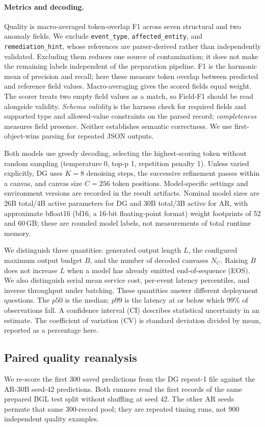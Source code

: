 \paragraph{Metrics and decoding.}
Quality is macro-averaged token-overlap F1 across seven structural and two
anomaly fields. We exclude \texttt{event\_type},
\texttt{affected\_entity}, and \texttt{remediation\_hint}, whose
references are parser-derived rather than independently validated.
Excluding them reduces one source of contamination; it does not make the
remaining labels independent of the preparation pipeline.
F1 is the harmonic mean of precision and recall; here these measure token
overlap between predicted and reference field values. Macro-averaging gives
the scored fields equal weight. The scorer treats two empty field values
as a match, so Field-F1 should be
read alongside validity. \emph{Schema validity} is the harness check for
required fields and supported type and allowed-value constraints on the parsed record;
\emph{completeness} measures field presence. Neither establishes semantic
correctness. We use first-object-wins parsing for repeated JSON outputs.

Both models use greedy decoding, selecting the highest-scoring token
without random sampling (temperature 0, top-p 1, repetition penalty 1).
Unless varied explicitly, DG uses $K{=}8$ denoising steps, the successive
refinement passes within a canvas, and canvas size $C{=}256$ token positions.
Model-specific settings and environment versions
are recorded in the result artifacts. Nominal model sizes are 26B total/4B
active parameters for DG and 30B total/3B active for AR, with approximate
bfloat16 (bf16, a 16-bit floating-point format) weight footprints of 52 and
60\,GB; these are rounded model labels,
not measurements of total runtime memory.

We distinguish three quantities: generated output length $L$, the configured
maximum output budget $B$, and the number of decoded canvases
$N_C$. Raising $B$ does not increase $L$ when a model has already emitted
end-of-sequence (EOS). We also distinguish serial mean service cost,
per-event latency percentiles, and inverse throughput under batching.
These quantities answer different deployment questions. The $p50$ is the
median; $p99$ is the latency at or below which 99\% of observations fall.
A confidence interval (CI) describes statistical uncertainty in an estimate.
The coefficient of variation (CV) is standard deviation divided by mean,
reported as a percentage here.


\subsection{Paired quality reanalysis}
We re-score the first 300 saved predictions from the DG repeat-1 file
against the AR-30B seed-42 predictions. Both runners read the first
records of the same prepared BGL test split without shuffling at seed 42.
The other AR seeds permute that same 300-record pool; they are repeated
timing runs, not 900 independent quality examples.

